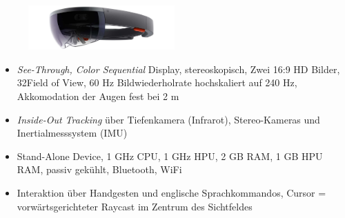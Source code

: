 \begin{frame}[fragile]{}
\begin{figure}[h!]
	\centering
	\includegraphics[width=0.5\textwidth]{images/hololens.jpg}
\end{figure}
\begin{itemize}
	\pause
	\item \textit{See-Through, Color Sequential} Display, stereoskopisch, Zwei 16:9 HD Bilder, 32\degree Field of View, 60 Hz Bildwiederholrate hochskaliert auf 240 Hz, Akkomodation der Augen fest bei 2 m
	\pause
	\item \textit{Inside-Out Tracking} über Tiefenkamera (Infrarot), Stereo-Kameras und Inertialmesssystem (IMU)
	\pause
	\item Stand-Alone Device, 1 GHz CPU, 1 GHz HPU, 2 GB RAM, 1 GB HPU RAM, passiv gekühlt, Bluetooth, WiFi
	\pause
	\item Interaktion über Handgesten und englische Sprachkommandos, Cursor = vorwärtsgerichteter Raycast im Zentrum des Sichtfeldes
\end{itemize}	
\end{frame}

